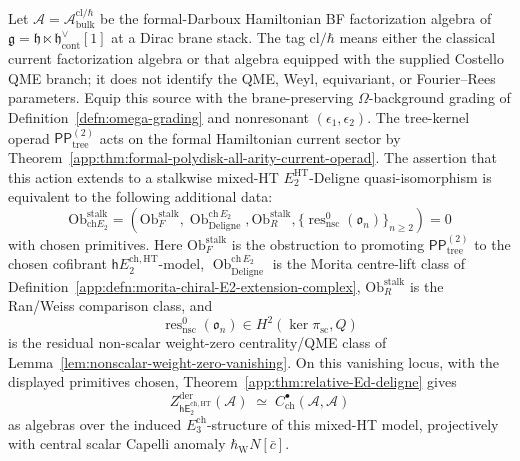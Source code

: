 \begin{thm}\label{app:thm:FCR-at-stalk}
Let \(\mathcal A=\mathcal A^{\mathrm{cl}/\hbar}_{\mathrm{bulk}}\) be the
formal-Darboux Hamiltonian BF factorization algebra of
\(\mathfrak g=\mathfrak h\ltimes\mathfrak h^\vee_{\mathrm{cont}}[1]\) at
a Dirac brane stack.  The tag \(\mathrm{cl}/\hbar\) means either the
classical current factorization algebra or that algebra equipped with
the supplied Costello QME branch; it does not identify the QME, Weyl,
equivariant, or Fourier--Rees parameters.  Equip this source with the
brane-preserving \(\Omega\)-background
grading of Definition~\ref{defn:omega-grading} and nonresonant
\((\epsilon_1,\epsilon_2)\).  The tree-kernel operad
\(\mathsf{PP}^{(2)}_{\mathrm{tree}}\) acts on the formal Hamiltonian
current sector by Theorem~\ref{app:thm:formal-polydisk-all-arity-current-operad}.
The assertion that this action extends to a stalkwise mixed-HT
\(E_2^{\mathrm{HT}}\)-Deligne quasi-isomorphism is equivalent to the
following additional data:
\[
  \mathrm{Ob}^{\mathrm{stalk}}_{\mathrm{ch}E_2}
  =
  \left(
    \mathrm{Ob}_{F}^{\mathrm{stalk}},
    \operatorname{Ob}^{\mathrm{ch}\,E_2}_{\mathrm{Deligne}},
    \mathrm{Ob}_{R}^{\mathrm{stalk}},
    \{\operatorname{res}^{0}_{\mathrm{nsc}}(\mathfrak o_n)\}_{n\ge2}
  \right)=0
\]
with chosen primitives.  Here
\(\mathrm{Ob}_{F}^{\mathrm{stalk}}\) is the obstruction to promoting
\(\mathsf{PP}^{(2)}_{\mathrm{tree}}\) to the chosen cofibrant
\(\mathsf hE_2^{\mathrm{ch},\mathrm{HT}}\)-model,
\(\operatorname{Ob}^{\mathrm{ch}\,E_2}_{\mathrm{Deligne}}\) is the
Morita centre-lift class of
Definition~\ref{app:defn:morita-chiral-E2-extension-complex},
\(\mathrm{Ob}_{R}^{\mathrm{stalk}}\) is the Ran/Weiss comparison class,
and
\[
  \operatorname{res}^{0}_{\mathrm{nsc}}(\mathfrak o_n)
  \in H^2(\ker\pi_{\mathrm{sc}},Q)
\]
is the residual non-scalar weight-zero centrality/QME class of
Lemma~\ref{lem:nonscalar-weight-zero-vanishing}.  On this vanishing
locus, with the displayed primitives chosen,
Theorem~\ref{app:thm:relative-Ed-deligne} gives
\[
  Z^{\mathrm{der}}_{\mathsf{hE}_2^{\mathrm{ch},\mathrm{HT}}}(\mathcal A)
   \;\simeq\;
   C^\bullet_{\mathrm{ch}}(\mathcal A,\mathcal A)
\]
as algebras over the induced \(E_3^{\mathrm{ch}}\)-structure of this
mixed-HT model, projectively with central scalar Capelli anomaly
\(\hbar_{\mathrm{W}} N[\bar c]\).
\end{thm}

